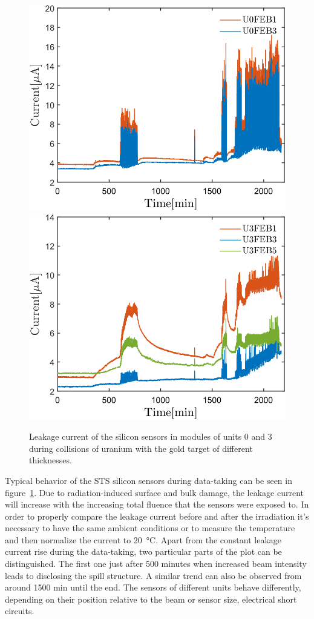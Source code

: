 \begin{figure}[!h]
\centering
\includegraphics[width=0.45\columnwidth]{Chapter5/DCS/images/uranium/U0.png}
\includegraphics[width=0.45\columnwidth]{Chapter5/DCS/images/uranium/U3.png}
\caption{Leakage current of the silicon sensors in modules of units 0 and 3 during collisions of uranium with the gold target of different thicknesses.}
\label{fig_msts_LC}
\end{figure}

Typical behavior of the \gls{STS} silicon sensors during data-taking can be seen in figure~\ref{fig_msts_LC}. Due to radiation-induced surface and bulk damage, the leakage current will increase with the increasing total fluence that the sensors were exposed to. In order to properly compare the leakage current before and after the irradiation it's necessary to have the same ambient conditions or to measure the temperature and then normalize the current to \SI{20}{\celsius}. Apart from the constant leakage current rise during the data-taking, two particular parts of the plot can be distinguished. The first one just after 500 minutes when increased beam intensity leads to disclosing the spill structure. A similar trend can also be observed from around 1500 min until the end. The sensors of different units behave differently, depending on their position relative to the beam or sensor size, electrical short circuits.


